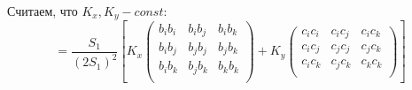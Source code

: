 \documentclass{bmstu}
\begin{document}
	Считаем, что $K_x, K_y - const$:
	\[
	= \dfrac{S_1}{(2S_1)^2} \left[K_x \begin{pmatrix}
		b_ib_i & b_ib_j & b_ib_k \\
		b_ib_j & b_jb_j & b_jb_k \\
		b_ib_k & b_jb_k & b_kb_k \\
	\end{pmatrix}+ K_y \begin{pmatrix}
	c_ic_i & c_ic_j & c_ic_k \\
	c_ic_j & c_jc_j & c_jc_k \\
	c_ic_k & c_jc_k & c_kc_k \\
	\end{pmatrix} \right] 
	\]
\end{document}
